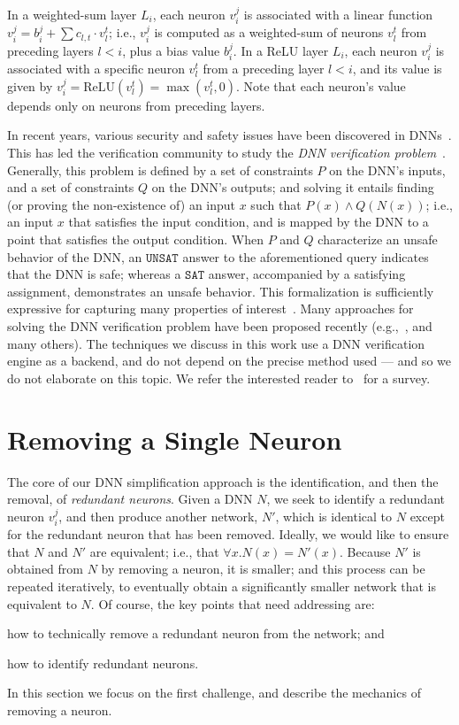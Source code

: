 \documentclass[10pt, conference, twocolumn, compsocconf]{IEEEtran}
\theoremstyle{remark}
\newcommand{\relu}{\text{ReLU}\xspace}
\newcommand{\sat}{\texttt{SAT}}
\newcommand{\unsat}{\texttt{UNSAT}}
\begin{document}
In a weighted-sum layer $L_i$, each neuron $v_i^j$ is associated with
a linear function $v_i^j=b_i^j + \sum c_{l,t}\cdot v_l^t$; i.e.,
$v_i^j$ is computed as a weighted-sum of neurons $v_l^t$ from
preceding layers $l<i$, plus a bias value $b_i^j$. In a ReLU layer
$L_i$, each neuron $v_i^j$ is associated with a specific neuron
$v_l^t$ from a preceding layer $l<i$, and its value is given by
$v_i^j=\relu{}(v_l^t)=\max(v_l^t, 0)$. Note that each neuron's value
depends only on neurons from preceding layers.

In recent years, various security and safety issues have been
discovered in DNNs~\cite{SzZaSuBrErGoFe13,KaBaDiJuKo17}. This has led
the verification community to study the \emph{DNN verification
  problem}~\cite{LiArLaBaKo19}. Generally, this problem is defined by
a set of constraints $P$ on the DNN's inputs, and a set of constraints
$Q$ on the DNN's outputs; and solving it entails finding (or proving
the non-existence of) an input $x$ such that $P(x)\wedge Q(N(x))$;
i.e., an input $x$ that satisfies the input condition, and is mapped
by the DNN to a point that satisfies the output condition. When $P$
and $Q$ characterize an unsafe behavior of the DNN, an $\unsat{}$
answer to the aforementioned query indicates that the DNN is safe;
whereas a $\sat{}$ answer, accompanied by a satisfying assignment,
demonstrates an unsafe behavior. This formalization is sufficiently
expressive for capturing many properties of
interest~\cite{KaBaDiJuKo17}.  Many approaches for solving the DNN
verification problem have been proposed recently
(e.g.,~\cite{KaBaDiJuKo17,HuKwWaWu17,GeMiDrTsChVe18,WaPeWhYaJa18}, and
many others). The techniques we discuss in this work use a DNN
verification engine as a backend, and do not depend on the precise
method used --- and so we do not elaborate on this topic. We refer the
interested reader to~\cite{LiArLaBaKo19} for a survey.

\section{Removing a Single Neuron}
\label{sec:formalization}

The core of our DNN simplification approach is the identification, and
then the removal, of \emph{redundant neurons}. Given a DNN $N$, we seek to
identify a redundant neuron $v_i^j$, and then produce another network,
$N'$, which is identical to $N$ except for the redundant neuron that
has been removed. Ideally, we would like to ensure that $N$ and $N'$ are
equivalent; i.e., that $\forall x. N(x)=N'(x)$. Because $N'$ is
obtained from $N$ by removing a neuron, it is smaller; and this
process can be repeated iteratively, to eventually obtain a
significantly smaller network that is equivalent to $N$.
Of course, the key points that need addressing are:
\begin{inparaenum}[(i)]
\item how to technically remove a redundant neuron from the network; and
\item how to identify redundant neurons.
\end{inparaenum}
In this section we focus on the first challenge, and describe the
mechanics of removing a neuron.
\end{document}
